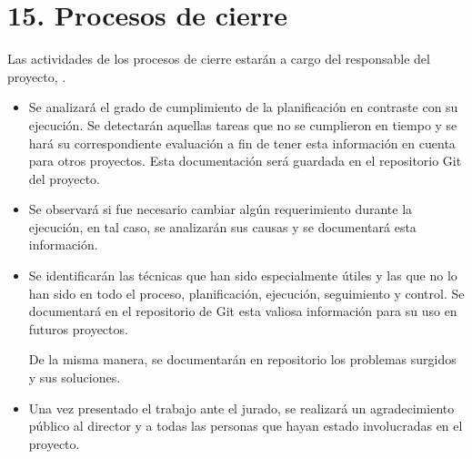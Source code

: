 \section{15. Procesos de cierre}    
\label{sec:cierre}

Las actividades de los procesos de cierre estarán a cargo del responsable del proyecto, \authorname .

\begin{itemize}
\item Se analizará el grado de cumplimiento de la planificación en contraste con su ejecución. Se detectarán aquellas tareas que no se cumplieron en tiempo y se hará su correspondiente evaluación a fin de tener esta información en cuenta para otros proyectos. Esta documentación será guardada en el repositorio Git del proyecto.

\item Se observará si fue necesario cambiar algún requerimiento durante la ejecución, en tal caso, se analizarán sus causas y se documentará esta información.

\item Se identificarán las técnicas que han sido especialmente útiles y las que no lo han sido en todo el proceso, planificación, ejecución, seguimiento y control. Se documentará en el repositorio de Git esta valiosa información para su uso en futuros proyectos.

De la misma manera, se documentarán en repositorio los problemas surgidos y sus soluciones.

\item Una vez presentado el trabajo ante el jurado, se realizará un agradecimiento público al
director y a todas las personas que hayan estado involucradas en el proyecto.

\end{itemize}